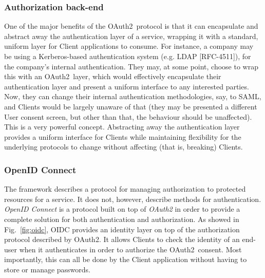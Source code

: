 \documentclass[a4paper,12pt]{article}
\def\oauth{OAuth2\xspace}
\def\myfig#1{Fig.~#1\xspace}
\def\rfc#1{RFC-#1\xspace}
\begin{document}
\subsubsection{Authorization back-end}
One of the major benefits of the \oauth\ protocol is that it can encapsulate and abstract away the authentication layer of a service, wrapping it with a standard, uniform layer for Client applications to consume. For instance, a company may be using a Kerberos-based authentication system (e.g. LDAP [\rfc{4511}]), for the company's internal authentication. They may, at some point, choose to wrap this with an \oauth\ layer, which would effectively encapsulate their authentication layer and present a uniform interface to any interested parties. Now, they can change their internal authentication methodologies, say, to SAML, and Clients would be largely unaware of that (they may be presented a different User consent screen, but other than that, the behaviour should be unaffected). This is a very powerful concept. Abstracting away the authentication layer provides a uniform interface for Clients while maintaining flexibility for the underlying protocols to change without affecting (that is, breaking) Clients.

\subsubsection{OpenID Connect}
The framework describes a protocol for managing authorization to protected resources for a service. It does not, however, describe methods for authentication. \textit{OpenID Connect} \cite{openid} is a protocol built on top of \textit{\oauth} in order to provide a complete solution for both authentication and authorization. As showed in \myfig{\ref{fig:oidc}}, OIDC provides an identity layer on top of the authorization protocol described by \oauth. It allows Clients to check the identity of an end-user when it authenticates in order to  authorize the \oauth\ consent. Most importantly, this can all be done by the Client application without having to store or manage passwords.
\end{document}
